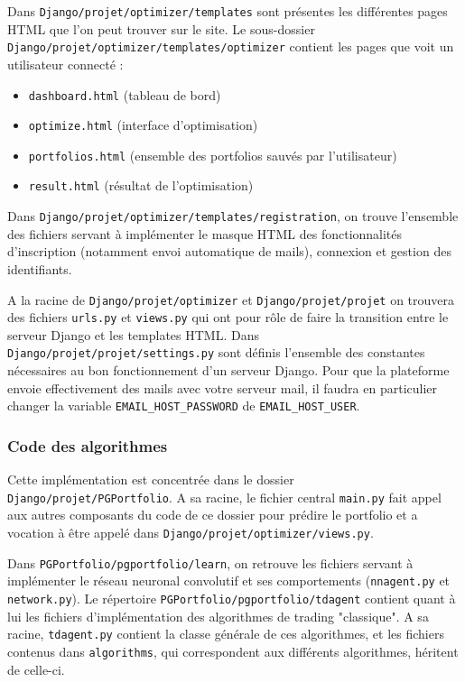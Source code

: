 \documentclass[a4paper, 10pt]{article}
\begin{document}
Dans \verb|Django/projet/optimizer/templates| sont présentes les différentes pages HTML que l'on peut trouver sur le site. Le sous-dossier \verb|Django/projet/optimizer/templates/optimizer| contient les pages que voit un utilisateur connecté :

\begin{itemize}
    \item \verb|dashboard.html| (tableau de bord)
    \item \verb|optimize.html| (interface d'optimisation)
    \item \verb|portfolios.html| (ensemble des portfolios sauvés par l'utilisateur)
    \item \verb|result.html| (résultat de l'optimisation)
\end{itemize}
    
Dans \verb|Django/projet/optimizer/templates/registration|, on trouve l'ensemble des fichiers servant à implémenter le masque HTML des fonctionnalités d'inscription (notamment envoi automatique de mails), connexion et gestion des identifiants.

A la racine de \verb|Django/projet/optimizer| et \verb|Django/projet/projet| on trouvera des fichiers \verb|urls.py| et \verb|views.py| qui ont pour rôle de faire la transition entre le serveur Django et les templates HTML. Dans \verb|Django/projet/projet/settings.py| sont définis l'ensemble des constantes nécessaires au bon fonctionnement d'un serveur Django. Pour que la plateforme envoie effectivement des mails avec votre serveur mail, il faudra en particulier changer la variable \verb|EMAIL_HOST_PASSWORD| de \verb|EMAIL_HOST_USER|.

\subsubsection{Code des algorithmes}
\label{sec:developpement_code_pgportofolio}

Cette implémentation est concentrée dans le dossier \texttt{Django/projet/PGPortfolio}. A sa racine, le fichier central \texttt{main.py} fait appel aux autres composants du code de ce dossier pour prédire le portfolio et a vocation à être appelé dans \texttt{Django/projet/optimizer/views.py}.

Dans \texttt{PGPortfolio/pgportfolio/learn}, on retrouve les fichiers servant à implémenter le réseau neuronal convolutif et ses comportements (\texttt{nnagent.py} et \texttt{network.py}). Le répertoire \texttt{PGPortfolio/pgportfolio/tdagent} contient quant à lui les fichiers d'implémentation des algorithmes de trading "classique". A sa racine, \texttt{tdagent.py} contient la classe générale de ces algorithmes, et les fichiers contenus dans \texttt{algorithms}, qui correspondent aux différents algorithmes, héritent de celle-ci.
\end{document}
